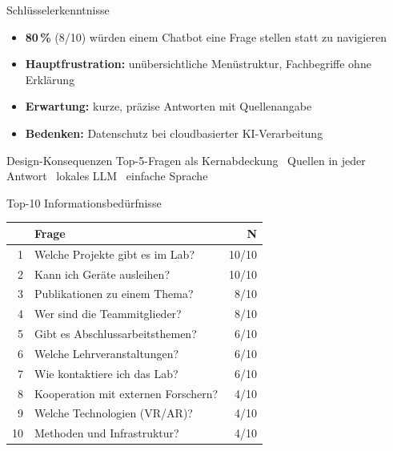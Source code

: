\documentclass[14pt,aspectratio=169]{beamer}
\begin{document}
\begin{frame}{Schlüsselerkenntnisse}
    \begin{itemize}
        \item \textbf{80\,\%} (8/10) würden einem Chatbot eine Frage stellen statt zu navigieren
        \item \textbf{Hauptfrustration:} unübersichtliche Menüstruktur, Fachbegriffe ohne Erklärung
        \item \textbf{Erwartung:} kurze, präzise Antworten mit Quellenangabe
        \item \textbf{Bedenken:} Datenschutz bei cloudbasierter KI-Verarbeitung
    \end{itemize}
    \vspace{0.3cm}
    \begin{exampleblock}{Design-Konsequenzen}
        Top-5-Fragen als Kernabdeckung \textbullet\ Quellen in jeder Antwort \textbullet\ lokales LLM \textbullet\ einfache Sprache
    \end{exampleblock}
\end{frame}

\begin{frame}{Top-10 Informationsbedürfnisse}
    \small
    \begin{tabularx}{\textwidth}{@{}r X r@{}}
        \toprule
        & \textbf{Frage} & \textbf{N} \\
        \midrule
        1 & Welche Projekte gibt es im Lab? & 10/10 \\
        2 & Kann ich Geräte ausleihen? & 10/10 \\
        3 & Publikationen zu einem Thema? & 8/10 \\
        4 & Wer sind die Teammitglieder? & 8/10 \\
        5 & Gibt es Abschlussarbeitsthemen? & 6/10 \\
        6 & Welche Lehrveranstaltungen? & 6/10 \\
        7 & Wie kontaktiere ich das Lab? & 6/10 \\
        8 & Kooperation mit externen Forschern? & 4/10 \\
        9 & Welche Technologien (VR/AR)? & 4/10 \\
        10 & Methoden und Infrastruktur? & 4/10 \\
        \bottomrule
    \end{tabularx}
    \normalsize
\end{frame}

\end{document}

